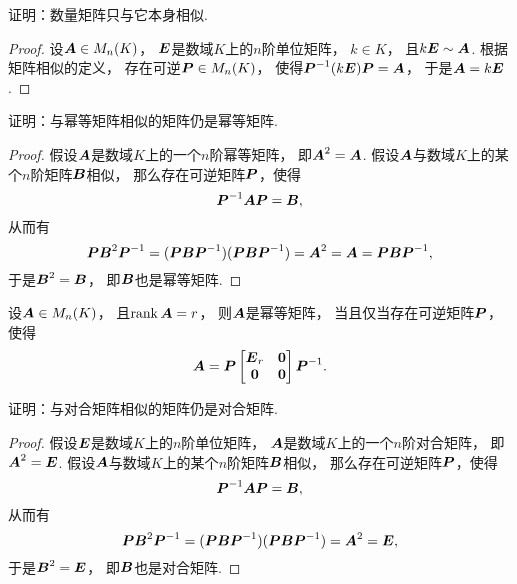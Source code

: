 \begin{example}
证明：数量矩阵只与它本身相似.
\begin{proof}
设\(\boldsymbol{A} \in M_n(K)\)，
\(\boldsymbol{E}\)是数域\(K\)上的\(n\)阶单位矩阵，
\(k \in K\)，
且\(k\boldsymbol{E} \sim \boldsymbol{A}\).
根据矩阵相似的定义，
存在可逆\(\boldsymbol{P} \in M_n(K)\)，
使得\(\boldsymbol{P}^{-1} (k\boldsymbol{E}) \boldsymbol{P} = \boldsymbol{A}\)，
于是\(\boldsymbol{A} = k\boldsymbol{E}\).
\end{proof}
\end{example}
\begin{example}\label{example:幂等矩阵.幂等矩阵的相似类}
证明：与幂等矩阵相似的矩阵仍是幂等矩阵.
\begin{proof}
假设\(\boldsymbol{A}\)是数域\(K\)上的一个\(n\)阶幂等矩阵，
即\(\boldsymbol{A}^2=\boldsymbol{A}\).
假设\(\boldsymbol{A}\)与数域\(K\)上的某个\(n\)阶矩阵\(\boldsymbol{B}\)相似，
那么存在可逆矩阵\(\boldsymbol{P}\)，使得\begin{equation*}
	\boldsymbol{P}^{-1}\boldsymbol{A}\boldsymbol{P} = \boldsymbol{B},
\end{equation*}
从而有\begin{equation*}
	\boldsymbol{P}\boldsymbol{B}^2\boldsymbol{P}^{-1}
	= (\boldsymbol{P}\boldsymbol{B}\boldsymbol{P}^{-1})(\boldsymbol{P}\boldsymbol{B}\boldsymbol{P}^{-1})
	= \boldsymbol{A}^2
	= \boldsymbol{A}
	= \boldsymbol{P}\boldsymbol{B}\boldsymbol{P}^{-1},
\end{equation*}
于是\(\boldsymbol{B}^2=\boldsymbol{B}\)，
即\(\boldsymbol{B}\)也是幂等矩阵.
\end{proof}
\end{example}
\begin{example}
设\(\boldsymbol{A} \in M_n(K)\)，
且\(\rank\boldsymbol{A} = r\)，
则\(\boldsymbol{A}\)是幂等矩阵，
当且仅当存在可逆矩阵\(\boldsymbol{P}\)，
使得\begin{equation*}
	\boldsymbol{A}
	=
	\boldsymbol{P}
	\begin{bmatrix}
		\boldsymbol{E}_r & \boldsymbol0 \\
		\boldsymbol0 & \boldsymbol0
	\end{bmatrix}
	\boldsymbol{P}^{-1}.
\end{equation*}
\end{example}
\begin{example}\label{example:对合矩阵.对合矩阵的相似类}
证明：与对合矩阵相似的矩阵仍是对合矩阵.
\begin{proof}
假设\(\boldsymbol{E}\)是数域\(K\)上的\(n\)阶单位矩阵，
\(\boldsymbol{A}\)是数域\(K\)上的一个\(n\)阶对合矩阵，
即\(\boldsymbol{A}^2=\boldsymbol{E}\).
假设\(\boldsymbol{A}\)与数域\(K\)上的某个\(n\)阶矩阵\(\boldsymbol{B}\)相似，
那么存在可逆矩阵\(\boldsymbol{P}\)，使得\begin{equation*}
	\boldsymbol{P}^{-1}\boldsymbol{A}\boldsymbol{P} = \boldsymbol{B},
\end{equation*}
从而有\begin{equation*}
	\boldsymbol{P}\boldsymbol{B}^2\boldsymbol{P}^{-1}
	= (\boldsymbol{P}\boldsymbol{B}\boldsymbol{P}^{-1})(\boldsymbol{P}\boldsymbol{B}\boldsymbol{P}^{-1})
	= \boldsymbol{A}^2
	= \boldsymbol{E},
\end{equation*}
于是\(\boldsymbol{B}^2=\boldsymbol{E}\)，
即\(\boldsymbol{B}\)也是对合矩阵.
\end{proof}
\end{example}
